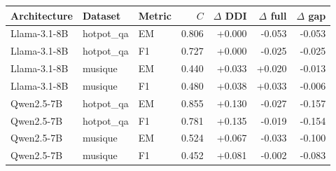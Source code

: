 \begin{tabular}{lllrrrr}
\toprule
Architecture & Dataset & Metric & $C$ & $\Delta$ DDI & $\Delta$ full & $\Delta$ gap \\
\midrule
Llama-3.1-8B & hotpot\_qa & EM & 0.806 & +0.000 & -0.053 & -0.053 \\
Llama-3.1-8B & hotpot\_qa & F1 & 0.727 & +0.000 & -0.025 & -0.025 \\
Llama-3.1-8B & musique & EM & 0.440 & +0.033 & +0.020 & -0.013 \\
Llama-3.1-8B & musique & F1 & 0.480 & +0.038 & +0.033 & -0.006 \\
Qwen2.5-7B & hotpot\_qa & EM & 0.855 & +0.130 & -0.027 & -0.157 \\
Qwen2.5-7B & hotpot\_qa & F1 & 0.781 & +0.135 & -0.019 & -0.154 \\
Qwen2.5-7B & musique & EM & 0.524 & +0.067 & -0.033 & -0.100 \\
Qwen2.5-7B & musique & F1 & 0.452 & +0.081 & -0.002 & -0.083 \\
\bottomrule
\end{tabular}

